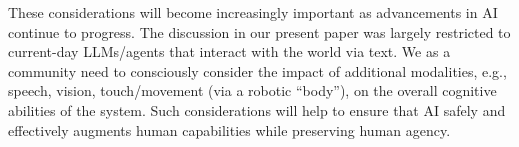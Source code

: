 \documentclass{article}
\theoremstyle{plain}
\theoremstyle{definition}
\theoremstyle{remark}
\begin{document}
These considerations will become increasingly important as advancements in AI continue to progress. The discussion in our present paper was largely restricted to current-day LLMs/agents that interact with the world via text. We as a community need to consciously consider the impact of additional modalities, e.g., speech, vision, touch/movement (via a robotic ``body''), on the overall cognitive abilities of the system. Such considerations will help to ensure that AI safely and effectively augments human capabilities while preserving human agency. 









\end{document}
